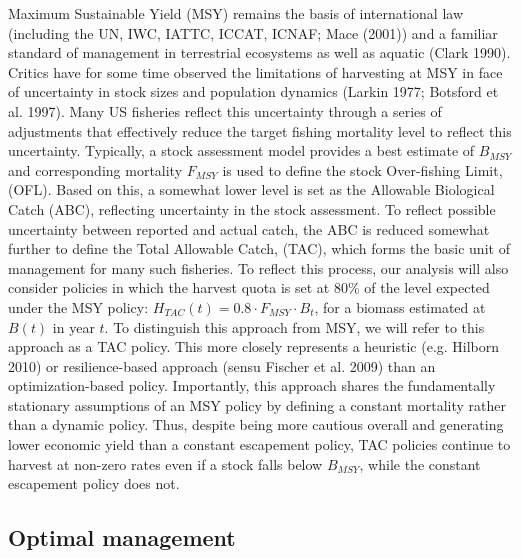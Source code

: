 \documentclass[3p]{elsarticle} %
\begin{document}
Maximum Sustainable Yield (MSY) remains the basis of international law
(including the UN, IWC, IATTC, ICCAT, ICNAF; Mace (2001)) and a familiar
standard of management in terrestrial ecosystems as well as aquatic
(Clark 1990). Critics have for some time observed the limitations of
harvesting at MSY in face of uncertainty in stock sizes and population
dynamics (Larkin 1977; Botsford et al. 1997). Many US fisheries reflect
this uncertainty through a series of adjustments that effectively reduce
the target fishing mortality level to reflect this uncertainty.
Typically, a stock assessment model provides a best estimate of
\(B_{MSY}\) and corresponding mortality \(F_{MSY}\) is used to define
the stock Over-fishing Limit, (OFL). Based on this, a somewhat lower
level is set as the Allowable Biological Catch (ABC), reflecting
uncertainty in the stock assessment. To reflect possible uncertainty
between reported and actual catch, the ABC is reduced somewhat further
to define the Total Allowable Catch, (TAC), which forms the basic unit
of management for many such fisheries. To reflect this process, our
analysis will also consider policies in which the harvest quota is set
at 80\% of the level expected under the MSY policy:
\(H_{TAC}(t) = 0.8 \cdot F_{MSY} \cdot B_t\), for a biomass estimated at
\(B(t)\) in year \(t\). To distinguish this approach from MSY, we will
refer to this approach as a TAC policy. This more closely represents a
heuristic (e.g. Hilborn 2010) or resilience-based approach (sensu
Fischer et al. 2009) than an optimization-based policy. Importantly,
this approach shares the fundamentally stationary assumptions of an MSY
policy by defining a constant mortality rather than a dynamic policy.
Thus, despite being more cautious overall and generating lower economic
yield than a constant escapement policy, TAC policies continue to
harvest at non-zero rates even if a stock falls below \(B_{MSY}\), while
the constant escapement policy does not.

\subsection{Optimal management}\label{optimal-management}
\end{document}
